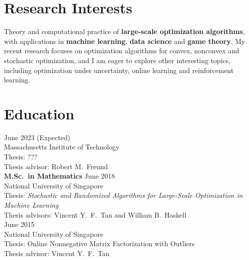 \documentclass[11pt]{article}
\begin{document}
\section*{\large Research Interests}

\noindent Theory and computational practice of {\bf large-scale optimization algorithms}, with applications in {\bf machine learning}, {\bf data science} and {\bf game theory}.  My recent  research focuses on optimization algorithms for  convex, nonconvex and stochastic optimization, and I am eager to explore other interesting topics, including optimization under uncertainty, online learning and reinforcement learning. 



\section*{\large Education}


 \hfill June 2023 (Expected)\\
{Massachusetts Institute of Technology} \\ %
{Thesis}: ???\\
{ Thesis advisor}: {Robert M.\ Freund}\\

{\noindent \bf M.Sc.\ in Mathematics}  \hfill June 2018\\
  {National University of Singapore}\\
{ Thesis}: {\em Stochastic and Randomized Algorithms for Large-Scale Optimization in Machine Learning} \\
{ Thesis advisors}: {Vincent Y.\ F.\ Tan and William B.\ Haskell}\\


 \hfill June 2015\\
{National University of Singapore} \\   %
{ Thesis}: {Online Nonnegative Matrix Factorization with Outliers}\\%
{ Thesis advisor}: {Vincent Y.\ F.\ Tan}

\end{document}
